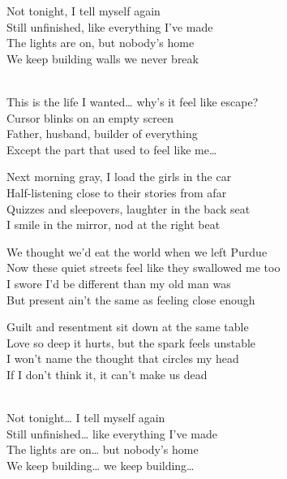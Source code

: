 \begin{lyrics}
Not tonight, I tell myself again\\
Still unfinished, like everything I’ve made\\
The lights are on, but nobody’s home\\
We keep building walls we never break

\\
This is the life I wanted… why’s it feel like escape?\\
Cursor blinks on an empty screen\\
Father, husband, builder of everything\\
Except the part that used to feel like me…

Next morning gray, I load the girls in the car\\
Half-listening close to their stories from afar\\
Quizzes and sleepovers, laughter in the back seat\\
I smile in the mirror, nod at the right beat

We thought we’d eat the world when we left Purdue\\
Now these quiet streets feel like they swallowed me too\\
I swore I’d be different than my old man was\\
But present ain’t the same as feeling close enough

Guilt and resentment sit down at the same table\\
Love so deep it hurts, but the spark feels unstable\\
I won’t name the thought that circles my head\\
If I don’t think it, it can’t make us dead

\\
Not tonight… I tell myself again\\
Still unfinished… like everything I’ve made\\
The lights are on… but nobody’s home\\
We keep building… we keep building…

\end{lyrics}

